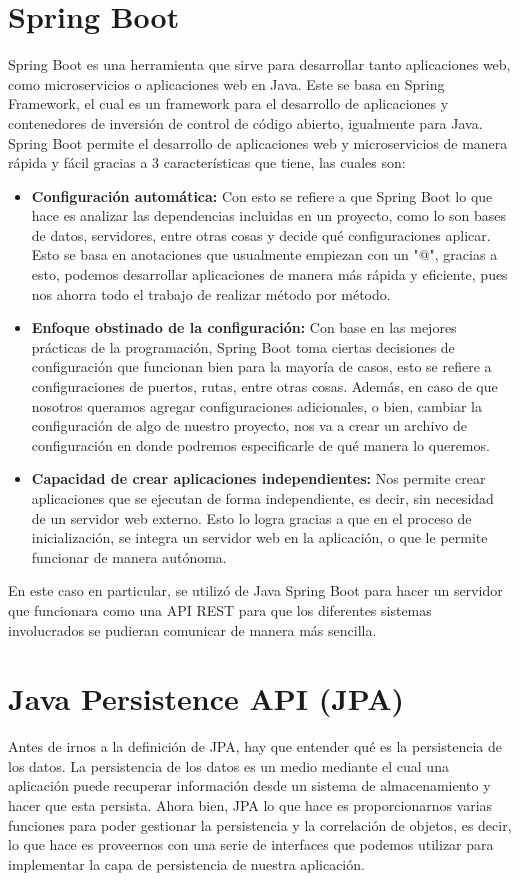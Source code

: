 
\section{Spring Boot}
Spring Boot es una herramienta que sirve para desarrollar tanto aplicaciones web, como microservicios o aplicaciones web en Java. Este se basa en Spring Framework, el cual es un framework para el desarrollo de aplicaciones y contenedores de inversión de control de código abierto, igualmente para Java.
Spring Boot permite el desarrollo de aplicaciones web y microservicios de manera rápida y fácil gracias a 3 características que tiene, las cuales son:
\begin{itemize}
    \item \textbf{Configuración automática:} Con esto se refiere a que Spring Boot lo que hace es analizar las dependencias incluidas en un proyecto, como lo son bases de datos, servidores, entre otras cosas y decide qué configuraciones aplicar. Esto se basa en anotaciones que usualmente empiezan con un "@", gracias a esto, podemos desarrollar aplicaciones de manera más rápida y eficiente, pues nos ahorra todo el trabajo de realizar método por método. \cite{CitaAJ01}
    \item \textbf{Enfoque obstinado de la configuración:} Con base en las mejores prácticas de la programación, Spring Boot toma ciertas decisiones de configuración que funcionan bien para la mayoría de casos, esto se refiere a configuraciones de puertos, rutas, entre otras cosas. Además, en caso de que nosotros queramos agregar configuraciones adicionales, o bien, cambiar la configuración de algo de nuestro proyecto, nos va a crear un archivo de configuración en donde podremos especificarle de qué manera lo queremos. \cite{CitaAJ02}
    \item \textbf{Capacidad de crear aplicaciones independientes:} Nos permite crear aplicaciones que se ejecutan de forma independiente, es decir, sin necesidad de un servidor web externo. Esto lo logra gracias a que en el proceso de inicialización, se integra un servidor web en la aplicación, o que le permite funcionar de manera autónoma. \cite{CitaAJ01}
\end{itemize}

En este caso en particular, se utilizó de Java Spring Boot para hacer un servidor que funcionara como una API REST para que los diferentes sistemas involucrados se pudieran comunicar de manera más sencilla.

\section{Java Persistence API (JPA)}
Antes de irnos a la definición de JPA, hay que entender qué es la persistencia de los datos. La persistencia de los datos es un medio mediante el cual una aplicación puede recuperar información desde un sistema de almacenamiento y hacer que esta persista. Ahora bien, JPA lo que hace es proporcionarnos varias funciones para poder gestionar la persistencia y la correlación de objetos, es decir, lo que hace es proveernos con una serie de interfaces que podemos utilizar para implementar la capa de persistencia de nuestra aplicación. \cite{CitaAJ03}

